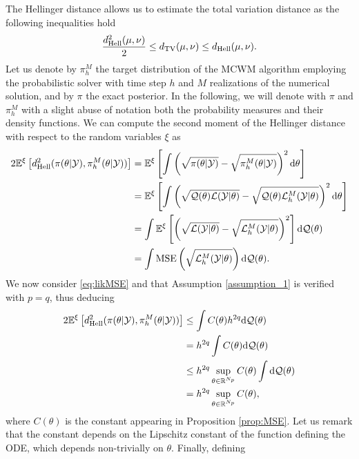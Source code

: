 \noindent The Hellinger distance allows us to estimate the total variation distance as the following inequalities hold \cite{GiS02}
\begin{equation}\label{eq:TVvsHell}
	\frac{d_{\mathrm{Hell}}^2(\mu, \nu)}{2} \leq d_{\mathrm{TV}}(\mu, \nu) \leq d_{\mathrm{Hell}}(\mu, \nu).
\end{equation}
Let us denote by $\pi_h^M$ the target distribution of the MCWM algorithm employing the probabilistic solver with time step $h$ and $M$ realizations of the numerical solution, and by $\pi$ the exact posterior. In the following, we will denote with $\pi$ and $\pi_h^M$ with a slight abuse of notation both the probability measures and their density functions. We can compute the second moment of the Hellinger distance with respect to the random variables $\xi$ as
\begin{equation}
\begin{aligned}
2\mathbb{E}^\xi\left[d_{\mathrm{Hell}}^2(\pi(\theta|\mathcal{Y}),\pi^M_h(\theta|\mathcal{Y}))\right] &= \mathbb{E}^\xi\left[\int \left(\sqrt{\pi(\theta|\mathcal{Y})} - \sqrt{\pi^M_h(\theta|\mathcal{Y})}\right)^2 \dd \theta\right] \\
&= \mathbb{E}^\xi\left[\int \left(\sqrt{\mathcal{Q}(\theta) \mathcal{L}(\mathcal{Y}|\theta)} - \sqrt{\mathcal{Q}(\theta) \mathcal{L}^M_h(\mathcal{Y}|\theta)}\right)^2 \dd \theta \right]\\
&= \int \mathbb{E}^\xi\left[\left(\sqrt{\mathcal{L}(\mathcal{Y}|\theta)} - \sqrt{\mathcal{L}^M_h(\mathcal{Y}|\theta)}\right)^2\right] \dd \mathcal{Q}(\theta)  \\
&= \int \operatorname{MSE}\left(\sqrt{\mathcal{L}^M_h(\mathcal Y|\theta)}\right) \dd \mathcal{Q}(\theta).
\end{aligned}
\end{equation}
We now consider \eqref{eq:likMSE} and that Assumption \ref{assumption_1} is verified with $p = q$, thus deducing
\begin{equation}
\begin{aligned}
2\mathbb{E}^\xi\left[d_{\mathrm{Hell}}^2(\pi(\theta|\mathcal{Y}),\pi^M_h(\theta|\mathcal{Y}))\right] &\leq \int C(\theta)h^{2q} \dd \mathcal{Q}(\theta) \\
&= h^{2q} \int C(\theta) \dd \mathcal{Q}(\theta) \\
&\leq h^{2q} \sup_{\theta \in \mathbb{R}^{N_p}} C(\theta) \int \dd\mathcal{Q}(\theta) \\
&= h^{2q} \sup_{\theta \in \mathbb{R}^{N_p}} C(\theta),
\end{aligned}
\end{equation}
where $C(\theta)$ is the constant appearing in Proposition \ref{prop:MSE}. Let us remark that the constant depends on the Lipschitz constant of the function defining the ODE, which depends non-trivially on $\theta$. Finally, defining 
